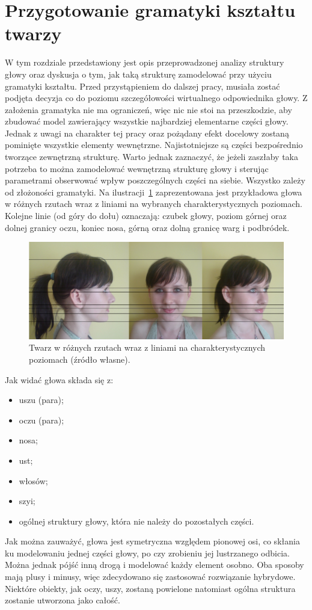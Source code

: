 \section{Przygotowanie gramatyki kształtu twarzy}
W tym rozdziale przedstawiony jest opis przeprowadzonej analizy struktury
głowy oraz dyskusja o tym, jak taką strukturę zamodelować przy użyciu
gramatyki kształtu.
Przed przystąpieniem do dalszej pracy, musiała zostać podjęta decyzja co
do poziomu szczegółowości wirtualnego odpowiednika głowy. Z założenia gramatyka
nie ma ograniczeń, więc nic nie stoi na przeszkodzie, aby zbudować model zawierający
wszystkie najbardziej elementarne części głowy. Jednak z uwagi na charakter
tej pracy oraz pożądany efekt docelowy zostaną pominięte wszystkie elementy
wewnętrzne. Najistotniejsze są części bezpośrednio tworzące zewnętrzną
strukturę. Warto jednak zaznaczyć, że jeżeli zaszłaby taka potrzeba to można
zamodelować wewnętrzną strukturę głowy i sterując parametrami obserwować wpływ
poszczególnych części na siebie. Wszystko zależy od złożoności gramatyki.
Na ilustracji~\ref{wiola_jpg} zaprezentowana jest przykładowa głowa
w różnych rzutach wraz z liniami na wybranych charakterystycznych poziomach.
Kolejne linie (od góry do dołu) oznaczają: czubek głowy, poziom górnej oraz
dolnej granicy oczu, koniec nosa, górną oraz dolną granicę warg i podbródek.

\begin{figure}[h!]
\centering
\includegraphics[width=14cm]{images/wiola.jpg}
\caption{Twarz w różnych rzutach wraz z liniami na charakterystycznych
poziomach (źródło własne).}
\label{wiola_jpg}
\end{figure}

Jak widać głowa składa się z:
\begin{itemize}
  \item uszu (para);
  \item oczu (para);
  \item nosa;
  \item ust;
  \item włosów;
  \item szyi;
  \item ogólnej struktury głowy, która nie należy do pozostałych części.
\end{itemize}
Jak można zauważyć, głowa jest symetryczna względem pionowej osi, co skłania ku
modelowaniu jednej części głowy, po czy zrobieniu jej lustrzanego odbicia. Można
jednak pójść inną drogą i modelować każdy element osobno. Oba sposoby mają plusy
i minusy, więc zdecydowano się zastosować rozwiązanie hybrydowe. Niektóre
obiekty, jak oczy, uszy, zostaną powielone natomiast ogólna struktura zostanie
utworzona jako całość.

